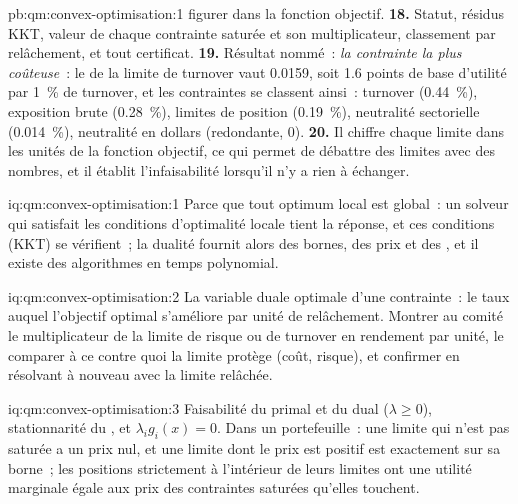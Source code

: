 \begin{solution}{pb:qm:convex-optimisation:1}
figurer dans la fonction objectif.
\textbf{18.} Statut, résidus KKT, valeur de chaque contrainte saturée et son multiplicateur, classement par relâchement, et tout certificat.
\textbf{19.} Résultat nommé~: \emph{la contrainte la plus coûteuse}~: le  de la limite de turnover vaut 0.0159, soit 1.6 points de base d'utilité par 1~\% de turnover, et les contraintes se classent ainsi~: turnover (0.44~\%), exposition
brute (0.28~\%), limites de position (0.19~\%), neutralité sectorielle (0.014~\%), neutralité en dollars (redondante, 0).
\textbf{20.} Il chiffre chaque limite dans les unités de la fonction objectif, ce qui permet de débattre des limites avec des nombres, et il établit l'infaisabilité lorsqu'il n'y a rien à échanger.
\end{solution}

\begin{solution}{iq:qm:convex-optimisation:1}
Parce que tout optimum local est global~: un solveur qui satisfait les conditions d'optimalité locale tient la réponse, et ces conditions (KKT) se vérifient~; la dualité fournit alors des bornes, des prix
et des , et il existe des algorithmes en temps polynomial.
\end{solution}

\begin{solution}{iq:qm:convex-optimisation:2}
La variable duale optimale d'une contrainte~: le taux auquel l'objectif optimal s'améliore par unité de relâchement. Montrer au comité le multiplicateur de la limite de risque ou de turnover en rendement par
unité, le comparer à ce contre quoi la limite protège (coût, risque), et confirmer en résolvant à nouveau avec la limite relâchée.
\end{solution}

\begin{solution}{iq:qm:convex-optimisation:3}
Faisabilité du primal et du dual ($\lambda \ge 0$), stationnarité du , et $\lambda_ig_i(x) = 0$. Dans un portefeuille~: une limite qui n'est pas saturée a un prix nul, et une limite dont le prix est positif
est exactement sur sa borne~; les positions strictement à l'intérieur de leurs limites ont une utilité marginale égale aux prix des contraintes saturées qu'elles touchent.
\end{solution}

